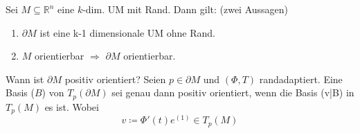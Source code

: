 \documentclass[9pt]{article}
\newcommand{\Rn}{\mathbb{R}^n}
\newenvironment{field}{}{\newpage}
\newif\ifnote
\newenvironment{note}{\notetrue}{\notefalse}
\newcommand{\localtag}{}
\newcommand{\globaltag}{}
\newcommand{\uuid}{}
\newcommand{\tags}[1]{
    \ifnote 
        \renewcommand{\localtag}{#1}
    \else
        \renewcommand{\globaltag}{#1}
    \fi 
    }
\newcommand{\xplain}[1]{\renewcommand{\uuid}{#1}}
\begin{document}
\begin{note}
	\xplain{ff11fe09-aac0-456a-b8bf-f652b973a4d7}
	\tags{satz, definition, rand, 1.5.2}
	
	\begin{field}
		Sei $M \subseteq \Rn$ eine $k$-dim. UM mit Rand. Dann gilt: (zwei Aussagen)
	\end{field}
	\begin{field}
		\begin{enumerate}
			\item $\partial M$ ist eine k-1 dimensionale UM ohne Rand.
			\item $M$ orientierbar $\Rightarrow$ $\partial M$ orientierbar.
		\end{enumerate}
	\end{field}
	\begin{field}
		Wann ist $\partial M$ positiv orientiert?
	\end{field}
	\begin{field}
		Seien $p\in \partial M $ und $(\Phi,T)$ randadaptiert. Eine Basis ($B$) von $T_p(\partial M)$ sei genau dann positiv orientiert, wenn die Basis (v|B) in $T_p(M)$ es ist. Wobei
		\begin{equation*}
			v \coloneqq \Phi'(t)e^{(1)} \in T_p(M)
		\end{equation*}
	\end{field}
\end{note}
\end{document}

